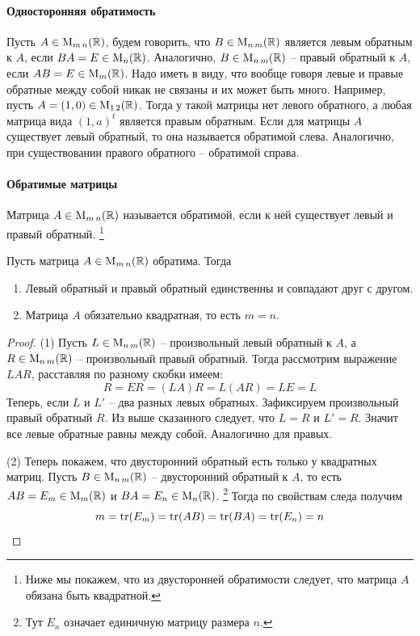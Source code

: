 \paragraph{Односторонняя обратимость}

Пусть $A\in\operatorname{M}_{m\,n}(\mathbb R)$, будем говорить, что $B\in\operatorname{M}_{n\,m}(\mathbb R)$ является левым обратным к $A$, если $BA = E\in\operatorname{M}_{n}(\mathbb R)$.
Аналогично, $B\in\operatorname{M}_{n\,m}(\mathbb R)$ -- правый обратный к $A$, если $AB = E\in\operatorname{M}_{m}(\mathbb R)$.
Надо иметь в виду, что вообще говоря левые и правые обратные между собой никак не связаны и их может быть много.
Например, пусть $A = (1, 0)\in\operatorname{M}_{1\,2}(\mathbb R)$.
Тогда у такой матрицы нет левого обратного, а любая матрица вида $(1, a)^t$ является правым обратным.
Если для матрицы $A$ существует левый обратный, то она называется обратимой слева.
Аналогично, при существовании правого обратного -- обратимой справа.

\paragraph{Обратимые матрицы}

\begin{definition}
\label{def::InvertibleMatrix}
Матрица $A\in\operatorname{M}_{m\,n}(\mathbb R)$ называется обратимой, если к ней существует левый и правый обратный.%
\footnote{Ниже мы покажем, что из двусторонней обратимости следует, что матрица $A$ обязана быть квадратной.}
\end{definition}

\begin{claim}
Пусть матрица $A\in\operatorname{M}_{m\,n}(\mathbb R)$ обратима.
Тогда
\begin{enumerate}
\item Левый обратный и правый обратный единственны и совпадают друг с другом.

\item Матрица $A$ обязательно квадратная, то есть $m = n$.
\end{enumerate}
\end{claim}
\begin{proof}
(1) Пусть $L\in\operatorname{M}_{n\,m}(\mathbb R)$ -- произвольный левый обратный к $A$, а $R\in\operatorname{M}_{n\,m}(\mathbb R)$ -- произвольный правый обратный.
Тогда рассмотрим выражение $LAR$, расставляя по разному скобки имеем:
\[
R = ER = (LA)R = L (AR) = LE = L
\]
Теперь, если $L$ и $L'$ -- два разных левых обратных.
Зафиксируем произвольный правый обратный $R$.
Из выше сказанного следует, что $L = R$ и $L' = R$.
Значит все левые обратные равны между собой.
Аналогично для правых.

(2) Теперь покажем, что двусторонний обратный есть только у квадратных матриц.
Пусть $B\in \operatorname{M}_{n\,m}(\mathbb R)$ -- двусторонний обратный к $A$, то есть $AB = E_m\in\operatorname{M}_{m}(\mathbb R)$ и $BA = E_n\in \operatorname{M}_{n}(\mathbb R)$.%
\footnote{Тут $E_n$ означает единичную матрицу размера $n$.}
Тогда по свойствам следа получим
\[
m = \operatorname{tr}(E_m) = \operatorname{tr}(AB) = \operatorname{tr}(BA) = \operatorname{tr}(E_n) = n
\]
\end{proof}

